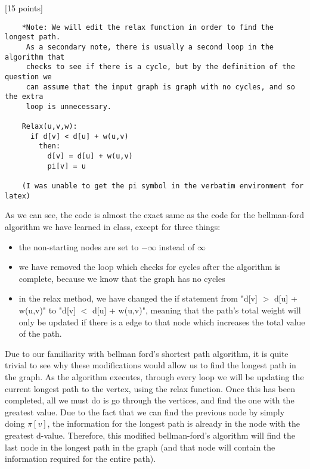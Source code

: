 \documentclass[12pt]{article}
\newcounter{ques}
\newenvironment{question}{\stepcounter{ques}{\noindent\bf Question \arabic{ques}:}}{\vspace{5mm}}
\begin{document}
\begin{question}[15 points]
\begin{verbatim}
    *Note: We will edit the relax function in order to find the longest path.
     As a secondary note, there is usually a second loop in the algorithm that
     checks to see if there is a cycle, but by the definition of the question we
     can assume that the input graph is graph with no cycles, and so the extra
     loop is unnecessary.

    Relax(u,v,w):
      if d[v] < d[u] + w(u,v)
        then:
          d[v] = d[u] + w(u,v)
          pi[v] = u

    (I was unable to get the pi symbol in the verbatim environment for latex)
  \end{verbatim}

  As we can see, the code is almost the exact same as the code for the bellman-ford algorithm we have learned in class, except for three things:
  \begin{itemize}
    \item the non-starting nodes are set to $-\infty$ instead of $\infty$
    \item we have removed the loop which checks for cycles after the algorithm is complete, because we know that the graph has no cycles
    \item in the relax method, we have changed the if statement from "d[v] $>$ d[u] + w(u,v)" to "d[v] $<$ d[u] + w(u,v)", meaning that the path's total weight will only be updated if there is a edge to that node which increases the total value of the path.
  \end{itemize}

  Due to our familiarity with bellman ford's shortest path algorithm, it is quite trivial to see why these modifications would allow us to find the longest path in the graph. As the algorithm executes, through every loop we will be updating the current longest path to the vertex, using the relax function. Once this has been completed, all we must do is go through the vertices, and find the one with the greatest value. Due to the fact that we can find the previous node by simply doing $\pi [v]$, the information for the longest path is already in the node with the greatest d-value. Therefore, this modified bellman-ford's algorithm will find the last node in the longest path in the graph (and that node will contain the information required for the entire path).


\end{question}
\end{document}
